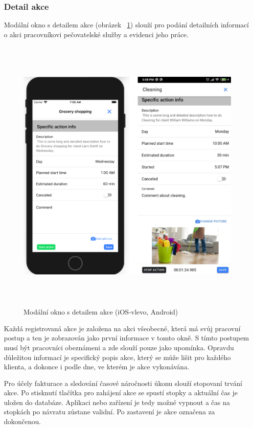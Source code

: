 \documentclass[
  glossaries,
]{kidiplom}
\begin{document}
\subsubsection{Detail akce}
\label{sec:actionDetail}
Modální okno s detailem akce (obrázek ~\ref{fig:actionDetail}) slouží pro podání detailních informací o akci pracovníkovi pečovatelské služby a evidenci jeho práce.

\begin{figure}[H]
  	\centering
 	 \includegraphics[width=14cm,height=14cm,keepaspectratio]{actionDetail}
 	 \caption{Modální okno s detailem akce (iOS-vlevo, Android)}
 	 \label{fig:actionDetail}
\end{figure}

Každá registrovaná akce je založena na akci všeobecné, která má svůj pracovní postup a ten je zobrazován jako první informace v tomto okně. S tímto postupem musí být pracovníci obeznámeni a zde slouží pouze jako upomínka. Opravdu důležitou informací je specifický popis akce, který se může lišit pro každého klienta, a dokonce i podle dne, ve kterém je akce vykonávána.

Pro účely fakturace a sledování časové náročnosti úkonu slouží stopovaní trvání akce. Po stisknutí tlačítka pro zahájení akce se spustí stopky a aktuální čas je uložen do databáze. Aplikaci nebo zařízení je tedy možné vypnout a čas na stopkách po návratu zůstane validní. Po zastavení je akce označena za dokončenou.
\end{document}
